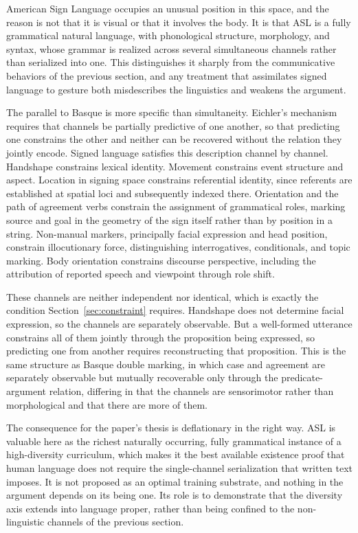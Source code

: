\documentclass[11pt]{article}
\begin{document}
American Sign Language occupies an unusual position in this space, and the reason is not that it is visual or that it involves the body. It is that ASL is a fully grammatical natural language, with phonological structure, morphology, and syntax, whose grammar is realized across several simultaneous channels rather than serialized into one. This distinguishes it sharply from the communicative behaviors of the previous section, and any treatment that assimilates signed language to gesture both misdescribes the linguistics and weakens the argument.

The parallel to Basque is more specific than simultaneity. Eichler's mechanism requires that channels be partially predictive of one another, so that predicting one constrains the other and neither can be recovered without the relation they jointly encode. Signed language satisfies this description channel by channel. Handshape constrains lexical identity. Movement constrains event structure and aspect. Location in signing space constrains referential identity, since referents are established at spatial loci and subsequently indexed there. Orientation and the path of agreement verbs constrain the assignment of grammatical roles, marking source and goal in the geometry of the sign itself rather than by position in a string. Non-manual markers, principally facial expression and head position, constrain illocutionary force, distinguishing interrogatives, conditionals, and topic marking. Body orientation constrains discourse perspective, including the attribution of reported speech and viewpoint through role shift.

These channels are neither independent nor identical, which is exactly the condition Section~\ref{sec:constraint} requires. Handshape does not determine facial expression, so the channels are separately observable. But a well-formed utterance constrains all of them jointly through the proposition being expressed, so predicting one from another requires reconstructing that proposition. This is the same structure as Basque double marking, in which case and agreement are separately observable but mutually recoverable only through the predicate-argument relation, differing in that the channels are sensorimotor rather than morphological and that there are more of them.

The consequence for the paper's thesis is deflationary in the right way. ASL is valuable here as the richest naturally occurring, fully grammatical instance of a high-diversity curriculum, which makes it the best available existence proof that human language does not require the single-channel serialization that written text imposes. It is not proposed as an optimal training substrate, and nothing in the argument depends on its being one. Its role is to demonstrate that the diversity axis extends into language proper, rather than being confined to the non-linguistic channels of the previous section.
\end{document}
